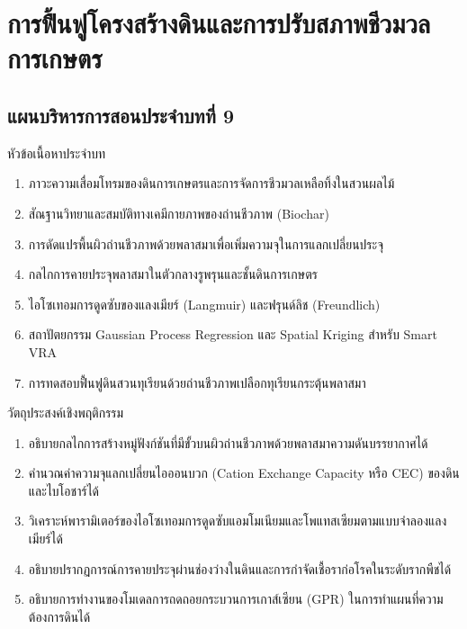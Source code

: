\chapter{การฟื้นฟูโครงสร้างดินและการปรับสภาพชีวมวลการเกษตร}
\label{chap:ch09}


\vspace*{-6pt}
\section*{แผนบริหารการสอนประจำบทที่ 9}

\begin{planbox}{หัวข้อเนื้อหาประจำบท}
\begin{enumerate}
    \item ภาวะความเสื่อมโทรมของดินการเกษตรและการจัดการชีวมวลเหลือทิ้งในสวนผลไม้
    \item สัณฐานวิทยาและสมบัติทางเคมีกายภาพของถ่านชีวภาพ (Biochar)
    \item การดัดแปรพื้นผิวถ่านชีวภาพด้วยพลาสมาเพื่อเพิ่มความจุในการแลกเปลี่ยนประจุ
    \item กลไกการคายประจุพลาสมาในตัวกลางรูพรุนและชั้นดินการเกษตร
    \item ไอโซเทอมการดูดซับของแลงเมียร์ (Langmuir) และฟรุนด์ลิช (Freundlich)
    \item สถาปัตยกรรม Gaussian Process Regression และ Spatial Kriging สำหรับ Smart VRA
    \item การทดสอบฟื้นฟูดินสวนทุเรียนด้วยถ่านชีวภาพเปลือกทุเรียนกระตุ้นพลาสมา
\end{enumerate}
\end{planbox}

\begin{planbox}{วัตถุประสงค์เชิงพฤติกรรม}
\begin{enumerate}
    \item อธิบายกลไกการสร้างหมู่ฟังก์ชันที่มีขั้วบนผิวถ่านชีวภาพด้วยพลาสมาความดันบรรยากาศได้
    \item คำนวณค่าความจุแลกเปลี่ยนไอออนบวก (Cation Exchange Capacity หรือ CEC) ของดินและไบโอชาร์ได้
    \item วิเคราะห์พารามิเตอร์ของไอโซเทอมการดูดซับแอมโมเนียมและโพแทสเซียมตามแบบจำลองแลงเมียร์ได้
    \item อธิบายปรากฏการณ์การคายประจุผ่านช่องว่างในดินและการกำจัดเชื้อราก่อโรคในระดับรากพืชได้
    \item อธิบายการทำงานของโมเดลการถดถอยกระบวนการเกาส์เซียน (GPR) ในการทำแผนที่ความต้องการดินได้
\end{enumerate}
\end{planbox}

